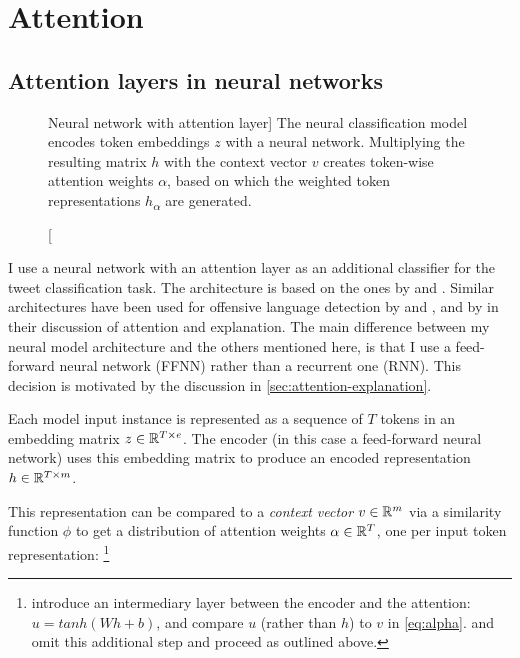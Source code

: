 \section{Attention}
\label{sec:attention}


\subsection{Attention layers in neural networks}
\label{sec:attention-what}

\begin{figure}[tb]
    \centering
    
    \caption
    [Neural network with attention layer]
    {The neural classification model encodes token embeddings $z$ with a neural network.
    Multiplying the resulting matrix $h$ with the context vector $v$ creates token-wise attention weights $\alpha$, based on which the weighted token representations $h$\textsubscript{$\alpha$} are generated.}
    \label{fig:attention}
\end{figure}

I use a neural network with an attention layer as an additional classifier for the tweet classification task.
The architecture is based on the ones by \citet{yang2016hierarchical} and \citet{sun2020understanding}.
Similar architectures have been used for offensive language detection by \citet{chakrabarty2019pay} and \citet{risch2020offensive}, and by \citet{jain2019attentionNotExplanation} in their discussion of attention and explanation.
The main difference between my neural model architecture and the others mentioned here, is that I use a feed-forward neural network (FFNN) rather than a recurrent one (RNN).
This decision is motivated by the discussion in \autoref{sec:attention-explanation}.

Each model input instance is represented as a sequence of $T$ tokens in an embedding matrix $z \in \mathbb{R}^{T \times e}$.
The encoder (in this case a feed-forward neural network) uses this embedding matrix to produce an encoded representation $h \in \mathbb{R}^{T \times m}$.

This representation can be compared to a \textit{context vector} $v \in \mathbb{R}^m$ via a similarity function $\phi$ to get a distribution of attention weights $\alpha \in \mathbb{R}^T$, one per input token representation:%
\footnote{\citet{yang2016hierarchical} introduce an intermediary layer between the encoder and the attention: $u = tanh(W h + b)$, and compare $u$ (rather than $h$) to $v$ in \autoref{eq:alpha}. \citet{sun2020understanding} and \citet{jain2019attentionNotExplanation} omit this additional step and proceed as outlined above.}

